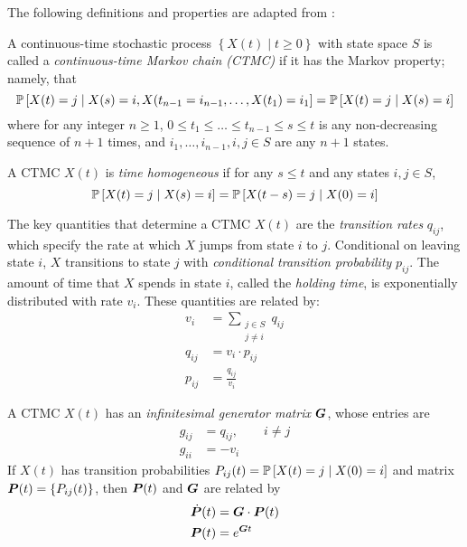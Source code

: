 The following definitions and properties are adapted from \cite{STAT455}:
\begin{defn}
A continuous-time stochastic process $\left\lbrace X(t) \; | \; t \geq 0 \right\rbrace$ with state space $S$ is called a \emph{continuous-time Markov chain (CTMC)} if it has the Markov property; namely, that 
\begin{equation}
\P \left[ X(t) = j \; | \; X(s) = i, X(t_{n-1} = i_{n-1}, \dots , X(t_1) = i_1 \right] = \P \left[ X(t) = j \; | \; X(s) = i \right]
\end{equation}
where for any integer $n \geq 1$, $0 \leq t_1 \leq \dots \leq t_{n-1} \leq s \leq t$ is any non-decreasing sequence of $n+1$ times, and $i_1,\dots,i_{n-1}, i, j \in S$ are any $n+1$ states.
\end{defn}
\begin{defn} A CTMC $X(t)$ is \emph{time homogeneous} if for any $s \leq t$ and any states $i,j \in S$,
\begin{equation}
\P \left[ X(t) = j \; | \; X(s) = i \right] = \P \left[ X(t-s) = j \; | \; X(0) = i \right]
\end{equation}
\end{defn}
\begin{defn}
The key quantities that determine a CTMC $X(t)$ are the \emph{transition rates} $q_{ij}$, which specify the rate at which $X$ jumps from state $i$ to $j$. Conditional on leaving state $i$, $X$ transitions to state $j$ with \emph{conditional transition probability} $p_{ij}$. The amount of time that $X$ spends in state $i$, called the \emph{holding time}, is exponentially distributed with rate $v_i$. These quantities are related by:
\begin{align}
v_i & = \sum_{\substack{j \in S \\ j \neq i}} q_{ij} \\
q_{ij} & = v_i \cdot p_{ij} \\
p_{ij} & = \frac{q_{ij}}{v_i}
\end{align} 
\end{defn}
\begin{defn}
A CTMC $X(t)$ has an \emph{infinitesimal generator matrix} $\mat{G}$, whose entries are
\begin{align}
g_{ij} &= q_{ij}, \qquad i \neq j \\
g_{ii} & = -v_i
\end{align}
If $X(t)$ has transition probabilities $P_{ij}(t) = \P \left[ X(t) = j \; | \; X(0) = i \right]$ and matrix $\mat{P}(t) = \lbrace P_{ij}(t) \rbrace$, then $\mat{P}(t)$ and $\mat{G}$ are related by
\begin{align}
\dot{\mat{P}}(t) & = \mat{G} \cdot \mat{P}(t) \\
\mat{P}(t)  &= e^{\mat{G}t} \label{eq:CTMCPG}
\end{align}
\end{defn}

